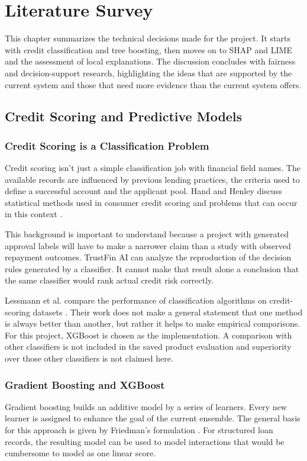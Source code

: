 \chapter[LITERATURE SURVEY]{Literature Survey}

This chapter summarizes the technical decisions made for the project. It starts with credit classification and tree boosting, then moves on to SHAP and LIME and the assessment of local explanations. The discussion concludes with fairness and decision-support research, highlighting the ideas that are supported by the current system and those that need more evidence than the current system offers.

\section{Credit Scoring and Predictive Models}
\subsection{Credit Scoring is a Classification Problem}
Credit scoring isn't just a simple classification job with financial field names. The available records are influenced by previous lending practices, the criteria used to define a successful account and the applicant pool. Hand and Henley discuss statistical methods used in consumer credit scoring and problems that can occur in this context \cite{handHenley1997}.

This background is important to understand because a project with generated approval labels will have to make a narrower claim than a study with observed repayment outcomes. TrustFin AI can analyze the reproduction of the decision rules generated by a classifier. It cannot make that result alone a conclusion that the same classifier would rank actual credit risk correctly.

Lessmann et al. compare the performance of classification algorithms on credit-scoring datasets \cite{lessmann2015}. Their work does not make a general statement that one method is always better than another, but rather it helps to make empirical comparisons. For this project, XGBoost is chosen as the implementation. A comparison with other classifiers is not included in the saved product evaluation and superiority over those other classifiers is not claimed here.

\subsection{Gradient Boosting and XGBoost}
Gradient boosting builds an additive model by a series of learners. Every new learner is assigned to enhance the goal of the current ensemble. The general basis for this approach is given by Friedman's formulation \cite{friedman2001}. For structured loan records, the resulting model can be used to model interactions that would be cumbersome to model as one linear score.

